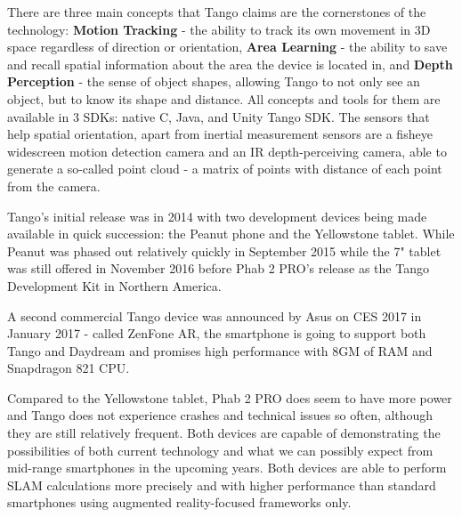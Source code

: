 \documentclass[12pt, a4paper]{article}
\begin{document}
There are three main concepts that Tango claims are the cornerstones of the technology: \textbf{Motion Tracking} - the ability to track its own movement in 3D space regardless of direction or orientation, \textbf{Area Learning} - the ability to save and recall spatial information about the area the device is located in, and \textbf{Depth Perception} - the sense of object shapes, allowing Tango to not only see an object, but to know its shape and distance. All concepts and tools for them are available in 3 SDKs: native C, Java, and Unity Tango SDK. The sensors that help spatial orientation, apart from inertial measurement sensors are a fisheye widescreen motion detection camera and an IR depth-perceiving camera, able to generate a so-called point cloud - a matrix of points with distance of each point from the camera.

Tango’s initial release was in 2014 with two development devices being made available in quick succession: the Peanut phone and the Yellowstone tablet. While Peanut was phased out relatively quickly in September 2015 while the 7" tablet was still offered in November 2016 before Phab 2 PRO’s release as the Tango Development Kit in Northern America.

A second commercial Tango device was announced by Asus on CES 2017 in January 2017 - called ZenFone AR, the smartphone is going to support both Tango and Daydream and promises high performance with 8GM of RAM and Snapdragon 821 CPU.

Compared to the Yellowstone tablet, Phab 2 PRO does seem to have more power and Tango does not experience crashes and technical issues so often, although they are still relatively frequent. Both devices are capable of demonstrating the possibilities of both current technology and what we can possibly expect from mid-range smartphones in the upcoming years. Both devices are able to perform SLAM calculations more precisely and with higher performance than standard smartphones using augmented reality-focused frameworks only.
\end{document}
